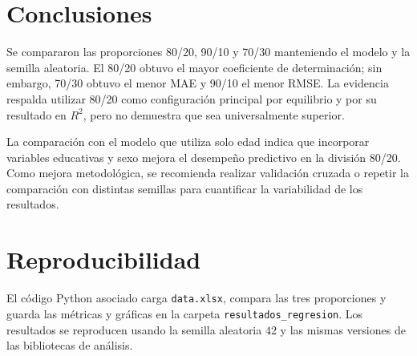 \documentclass[12pt,a4paper]{article}
\begin{document}
\section{Conclusiones}
Se compararon las proporciones 80/20, 90/10 y 70/30 manteniendo el modelo y la semilla aleatoria. El 80/20 obtuvo el mayor coeficiente de determinación; sin embargo, 70/30 obtuvo el menor MAE y 90/10 el menor RMSE. La evidencia respalda utilizar 80/20 como configuración principal por equilibrio y por su resultado en $R^2$, pero no demuestra que sea universalmente superior.

La comparación con el modelo que utiliza solo edad indica que incorporar variables educativas y sexo mejora el desempeño predictivo en la división 80/20. Como mejora metodológica, se recomienda realizar validación cruzada o repetir la comparación con distintas semillas para cuantificar la variabilidad de los resultados.

\section*{Reproducibilidad}
El código Python asociado carga \texttt{data.xlsx}, compara las tres proporciones y guarda las métricas y gráficas en la carpeta \texttt{resultados\_regresion}. Los resultados se reproducen usando la semilla aleatoria $42$ y las mismas versiones de las bibliotecas de análisis.
\end{document}
